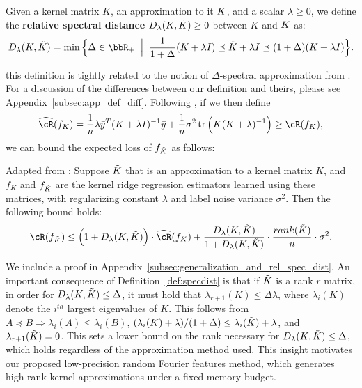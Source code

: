 \begin{definition}
	\label{def:specdist}
	Given a kernel matrix $K$, an approximation to it $\tilde{K}$, and a scalar $\lambda \geq 0$, we define the \textbf{relative spectral distance} $D_{\lambda}(K,\tilde{K})\geq 0$ between $K$ and $\tilde{K}$ as:
	$$D_{\lambda}(K,\tK) = \min \Big\{\Delta \in \RR_{+} \;\;\Big|\;\; \frac{1}{1+\Delta}(K+\lambda I) \preceq \tK + \lambda I \preceq (1+\Delta)(K+\lambda I)\Big\}.$$
\end{definition}

this definition is tightly related to the notion of $\Delta$-spectral approximation from \citet{avron17}. For a discussion of the differences between our definition and theirs, please see Appendix~\ref{subsec:app_def_diff}. Following \citet{avron17}, if we then define
$$\hcR(f_K) = \frac{1}{n}\lambda \by^T(K+\lambda I)^{-1}\by + \frac{1}{n}\sigma^2 \tr\Big(K(K+\lambda)^{-1}\Big) \geq \cR(f_K),$$
we can bound the expected loss of $f_{\tilde{K}}$ as follows:

\begin{proposition}{Adapted from \citep{avron17}:}
	\label{prop:avron}
	Suppose $\tilde{K}$ that is an approximation to a kernel matrix $K$, and $f_{K}$ and $f_{\tilde{K}}$ are the kernel ridge regression estimators learned using these matrices, with regularizing constant $\lambda$ and label noise variance $\sigma^2$. Then the following bound holds:
	\begin{eqnarray}
	\cR(f_{\tK}) \leq \Big(1+D_{\lambda}(K,\tK)\Big)\cdot \hcR(f_K) + \frac{D_{\lambda}(K,\tK)}{1+D_{\lambda}(K,\tK)}\cdot \frac{rank(\tK)}{n}\cdot\sigma^2.
	\end{eqnarray}
\end{proposition}
We include a proof in Appendix~\ref{subsec:generalization_and_rel_spec_dist}. An important consequence of Definition~\ref{def:specdist} is that if $\tilde{K}$ is a rank $r$ matrix, in order for $D_{\lambda}(K,\tilde{K}) \leq \Delta$, it must hold that $\lambda_{r+1}(K) \leq \Delta \lambda$, where $\lambda_i(K)$ denote the $i^{th}$ largest eigenvalues of $K$.  This follows from $A\preceq B \Rightarrow \lambda_i(A) \leq \lambda_i(B)$, $(\lambda_i(K) + \lambda)/(1+\Delta) \leq \lambda_i(\tilde{K}) + \lambda$, and $\lambda_{r+1}(\tilde{K}) = 0$.  This sets a lower bound on the rank necessary for $D_{\lambda}(K,\tilde{K}) \leq \Delta$, which holds regardless of the approximation method used. This insight motivates our proposed low-precision random Fourier features method, which generates high-rank kernel approximations under a fixed memory budget.